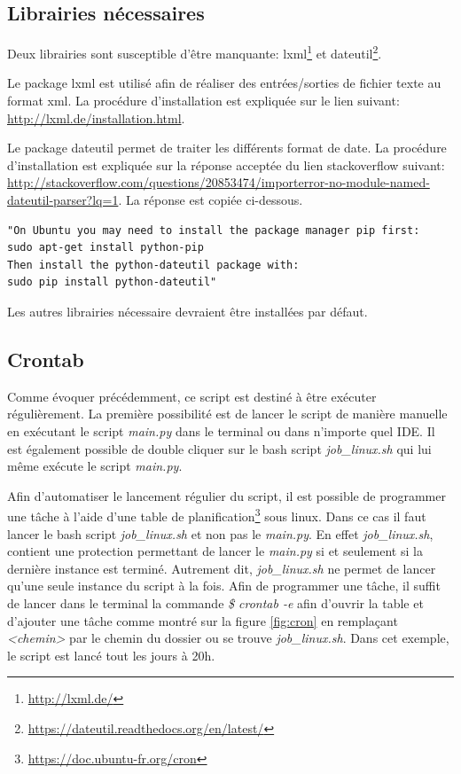\documentclass[notitlepage]{report}
\begin{document}
\subsection{Librairies nécessaires}
Deux librairies sont susceptible d'être manquante: lxml\footnote{\url{http://lxml.de/}} et dateutil\footnote{\url{https://dateutil.readthedocs.org/en/latest/}}.

Le package lxml est utilisé afin de réaliser des entrées/sorties de fichier texte au format xml. La procédure d'installation est expliquée sur le lien suivant: \url{http://lxml.de/installation.html}.

Le package dateutil permet de traiter les différents format de date. La procédure d'installation est expliquée sur la réponse acceptée du lien stackoverflow suivant: \url{http://stackoverflow.com/questions/20853474/importerror-no-module-named-dateutil-parser?lq=1}. La réponse est copiée ci-dessous.
\begin{verbatim}
"On Ubuntu you may need to install the package manager pip first:
sudo apt-get install python-pip
Then install the python-dateutil package with:
sudo pip install python-dateutil"
\end{verbatim}

Les autres librairies nécessaire devraient être installées par défaut.

\subsection{Crontab}
Comme évoquer précédemment, ce script est destiné à être exécuter régulièrement. La première possibilité est de lancer le script de manière manuelle en exécutant le script \emph{main.py} dans le terminal ou dans n'importe quel IDE. Il est également possible de double cliquer sur le bash script \emph{job\_linux.sh} qui lui même exécute le script \emph{main.py}.

Afin d'automatiser le lancement régulier du script, il est possible de programmer une tâche à l'aide d'une table de planification\footnote{\url{https://doc.ubuntu-fr.org/cron}} sous linux. Dans ce cas il faut lancer le bash script \emph{job\_linux.sh} et non pas le \emph{main.py}. En effet \emph{job\_linux.sh}, contient une protection permettant de lancer le \emph{main.py} si et seulement si la dernière instance est terminé. Autrement dit, \emph{job\_linux.sh} ne permet de lancer qu'une seule instance du script à la fois. Afin de programmer une tâche, il suffit de lancer dans le terminal la commande \emph{\$ crontab -e} afin d'ouvrir la table et d'ajouter une tâche comme montré sur la figure \ref{fig:cron} en remplaçant \emph{<chemin>} par le chemin du dossier ou se trouve \emph{job\_linux.sh}. Dans cet exemple, le script est lancé tout les jours à 20h.
\end{document}
